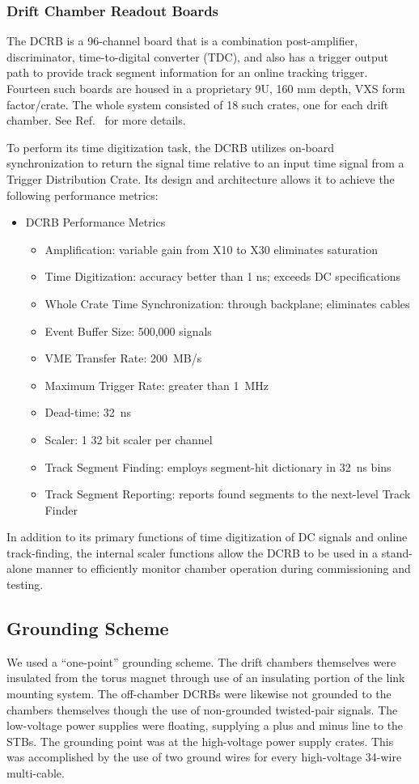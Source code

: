 \subsubsection{Drift Chamber Readout Boards}

The DCRB is a 96-channel board that is a combination post-amplifier,
discriminator, time-to-digital converter (TDC), and also has a trigger
output path to provide track segment information for an online tracking trigger.
Fourteen such boards are housed in
a proprietary 9U, 160 mm depth, VXS form factor/crate.
The whole system consisted of 18 such crates, one for each drift chamber.
See Ref.~\cite{daq-nim} for more details.

To perform its time digitization task, the DCRB utilizes on-board synchronization to
return the signal time relative to an input time signal from  a Trigger Distribution
Crate. Its design and architecture
allows it to achieve the following performance metrics:
\begin{itemize}
\item DCRB Performance Metrics
\begin{itemize}
\item Amplification: variable gain from X10 to X30 eliminates saturation
\item Time Digitization: accuracy better than 1 ns; exceeds DC specifications
\item Whole Crate Time Synchronization: through backplane; eliminates cables
\item Event Buffer Size: 500,000 signals
\item VME Transfer Rate: 200~MB/s
\item Maximum Trigger Rate: greater than 1~MHz
\item Dead-time: 32~ns
\item Scaler: 1 32 bit scaler per channel
\item Track Segment Finding: employs segment-hit dictionary in 32~ns bins
\item Track Segment Reporting: reports found segments to the next-level Track Finder
\end{itemize}
\end{itemize}

In addition to its primary functions of time digitization of DC signals and online
track-finding, the internal scaler functions allow the DCRB to be used in 
a stand-alone manner to efficiently monitor chamber operation during commissioning
and testing.

\subsection{Grounding Scheme}

We used a ``one-point'' grounding scheme.  The drift chambers themselves were insulated
from the torus magnet through use of an insulating portion of the link
mounting system.  The off-chamber DCRBs were likewise not grounded
to the chambers themselves though the use of non-grounded twisted-pair signals.
The low-voltage power supplies were floating, supplying a plus and minus line 
to the STBs.
The grounding point was at the high-voltage power supply crates.  This was accomplished
by the use of two ground wires for every high-voltage 34-wire multi-cable.
